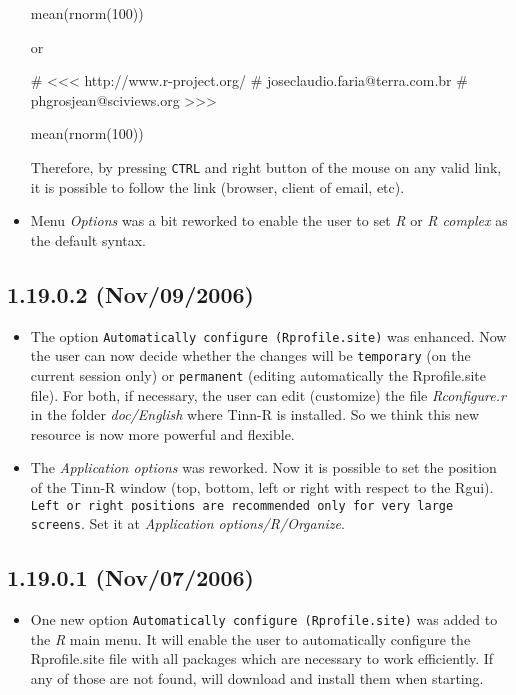 \begin{itemize}
\begin{Scode}
      mean(rnorm(100))
    \end{Scode}

    or

    \begin{Scode}
      # <<< http://www.r-project.org/
      #     joseclaudio.faria@terra.com.br
      #     phgrosjean@sciviews.org >>>

      mean(rnorm(100))
    \end{Scode}

    Therefore, by pressing \texttt{CTRL} and right button of the mouse on any
    valid link, it is possible to follow the link (browser, client of email, etc).
  \item Menu \textit{Options} was a bit reworked to enable the user to set
    \textit{R} or \textit{R complex} as the default syntax.
\end{itemize}


\subsection{1.19.0.2 (Nov/09/2006)}

\begin{itemize}
  \item The option \texttt{Automatically configure \RR{} (Rprofile.site)}
    was enhanced. Now the user can now decide whether the changes will be
    \texttt{temporary} (on the current session only) or \texttt{permanent}
    (editing automatically the Rprofile.site file). For both, if necessary,
    the user can edit (customize) the file \textit{Rconfigure.r} in the
    folder \textit{doc/English} where Tinn-R is installed. So we think this
    new resource is now more powerful and flexible.
  \item The \textit{Application options} was reworked. Now it is possible to
    set the position of the Tinn-R window (top, bottom, left or right with
    respect to the Rgui). \texttt{Left or right positions are recommended only for very
      large screens}. Set it at \textit{Application options/R/Organize}.
\end{itemize}


\subsection{1.19.0.1 (Nov/07/2006)}

\begin{itemize}
  \item One new option \texttt{Automatically configure \RR{} (Rprofile.site)}
    was added to the \textit{R} main menu. It will enable the user to
    automatically configure the Rprofile.site file with all packages which
    are necessary to work efficiently. If any of those are not found, \RR{}
    will download and install them when starting.
\end{itemize}


